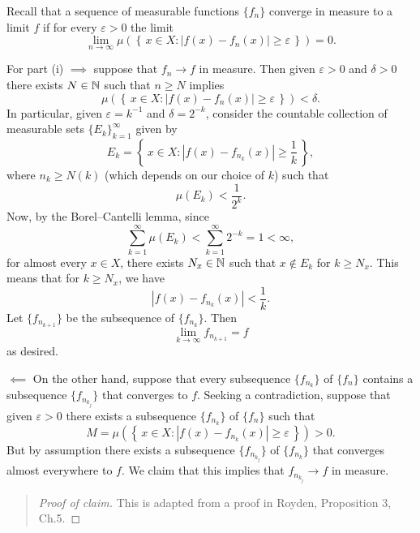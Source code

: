 \begin{solution}
  Recall that a sequence of measurable functions $\{f_n\}$ converge in
  measure to a limit $f$ if for every $\varepsilon>0$ the limit
  \[
    \lim_{n\to\infty}
    \mu\left(\left\{\,x\in X:|f(x)-f_n(x)|\geq\varepsilon\,\right\}\right)=0.
  \]

  For part (i) $\implies$ suppose that $f_n\to f$ in measure. Then given
  $\varepsilon>0$ and $\delta>0$ there exists $N\in\mathbb{N}$ such that
  $n\geq N$ implies
  \[
    \mu\left(\left\{\,%
        x\in X:|f(x)-f_n(x)|\geq\varepsilon%
        \,\right\}\right)%
    <\delta.
  \]
  In particular, given $\varepsilon=k^{-1}$ and $\delta=2^{-k}$, consider
  the countable collection of measurable sets ${\{E_k\}}_{k=1}^\infty$
  given by
  \[
    E_k=\left\{\,x\in X:|f(x)-f_{n_k}(x)|\geq\frac{1}{k}\,\right\},
  \]
  where $n_k\geq N(k)$ (which depends on our choice of $k$) such that
  \[
    \mu(E_k)<\frac{1}{2^k}.
  \]
  Now, by the Borel--Cantelli lemma, since
  \[
    \sum_{k=1}^\infty \mu(E_k)<\sum_{k=1}^\infty 2^{-k}=1<\infty,
  \]
  for almost every $x\in X$, there exists $N_x\in\mathbb{N}$ such that $x\notin
  E_k$ for $k\geq N_x$. This means that for $k\geq N_x$, we have
  \[
    |f(x)-f_{n_k}(x)|<\frac{1}{k}.
  \]
  Let $\{f_{n_{k+1}}\}$ be the subsequence of $\{f_{n_k}\}$. Then
  \[
    \lim_{k\to\infty} f_{n_{k+1}}=f
  \]
  as desired.

  $\impliedby$ On the other hand, suppose that every subsequence
  $\{f_{n_k}\}$ of $\{f_n\}$ contains a subsequence $\{f_{n_{k_j}}\}$ that
  converges to $f$. Seeking a contradiction, suppose that given
  $\varepsilon>0$ there exists a subsequence $\{f_{n_k}\}$ of $\{f_n\}$
  such that
  \[
    M=\mu\left(\left\{\,x\in
        X:|f(x)-f_{n_k}(x)|\geq\varepsilon\,\right\}\right)>0.
  \]
  But by assumption there exists a subsequence $\{f_{n_{k_j}}\}$ of
  $\{f_{n_k}\}$ that converges almost everywhere to $f$. We claim that this
  implies that $f_{n_{k_j}}\to f$ in measure.
  \begin{quote}
  \begin{proof}[Proof of claim]
    This is adapted from a proof in Royden, Proposition 3, Ch.\@ 5.


\end{proof}
\end{quote}
\end{solution}
